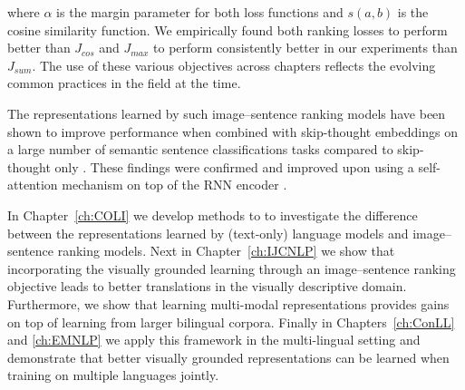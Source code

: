 where $\alpha$ is the margin parameter for both loss functions and $s(a, b)$ is the cosine similarity
function.
We empirically found both ranking losses to perform better than $J_{cos}$ and $J_{max}$ to perform
consistently better in our experiments than $J_{sum}$. The use of these various objectives across
chapters  reflects the evolving common practices in the field at the time.




The representations learned by such image--sentence  ranking models have
been shown
to improve performance when combined with skip-thought embeddings
on a large number of semantic sentence classifications tasks compared to
skip-thought only \citep{kiela2017learning}. These findings were confirmed and improved upon using a
self-attention mechanism on top of the RNN encoder \citep{yoo2017improving}.


In Chapter~\ref{ch:COLI} we develop methods to
to investigate the difference between the representations learned by (text-only) language
models and image--sentence ranking models.
Next in Chapter~\ref{ch:IJCNLP} we show that incorporating
the visually grounded learning through an image--sentence ranking objective
leads to better translations in the visually descriptive domain. Furthermore,
we show that learning multi-modal representations provides gains on top of learning
from larger bilingual corpora.
Finally in Chapters~\ref{ch:ConLL} and \ref{ch:EMNLP} we apply this
framework in the multi-lingual setting and demonstrate
that better visually grounded representations can be learned when training on multiple
languages jointly.

